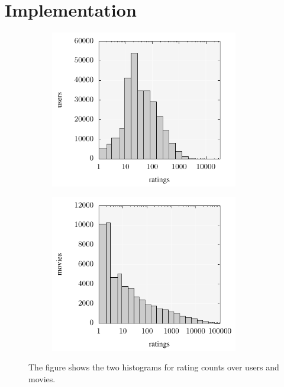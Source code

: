 \documentclass[crop=false,10pt]{standalone}
\begin{document}
  \section{Implementation} %
  \label{sec:Implementation}
    \begin{figure}
      \center
      \begin{subfigure}[b]{0.49\textwidth}
        \center
        \includegraphics[width=0.9\textwidth]{figures/movielens-user-histogram.pdf}
      \end{subfigure}
      \begin{subfigure}[b]{0.49\textwidth}
        \center
        \includegraphics[width=0.9\textwidth]{figures/movielens-movie-histogram.pdf}
      \end{subfigure}
      \caption{%
        The figure shows the two histograms for rating counts over users and movies.
      }
      \label{fig:rating-histograms}
    \end{figure}
\end{document}
